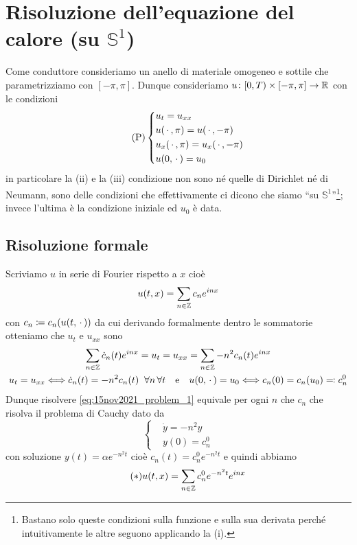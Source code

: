 

\section{Risoluzione dell'equazione del calore (su $\mathbb S^1$)}

Come conduttore consideriamo un anello di materiale omogeneo e sottile che parametrizziamo con $[-\pi, \pi]$. Dunque consideriamo $u \colon [0, T) \times [-\pi, \pi] \to \mathbb R$ con le condizioni
\begin{equation}
\tag{P} \label{eq:15nov2021_problem_1}
\left\{
\begin{aligned}
	& u_t = u_{xx} \\
	& u(\,\cdot\,, \pi) = u(\,\cdot\,, -\pi) \\
	& u_x(\,\cdot\,, \pi) = u_x(\,\cdot\,, -\pi) \\
	& u(0, \,\cdot\,) = u_0
\end{aligned}
\right.
\end{equation}
in particolare la (ii) e la (iii) condizione non sono né quelle di Dirichlet né di Neumann, sono delle condizioni che effettivamente ci dicono che siamo ``su $\mathbb S^1$''\footnote{Bastano solo queste condizioni sulla funzione e sulla sua derivata perché intuitivamente le altre seguono applicando la (i).}; invece l'ultima è la condizione iniziale ed $u_0$ è data.

\subsection{Risoluzione formale}

Scriviamo $u$ in serie di Fourier rispetto a $x$ cioè
$$
u(t, x) = \sum_{n \in \mathbb Z} c_n e^{inx}
$$
con $c_n \coloneqq c_n(u(t, \,\cdot\,))$ da cui derivando formalmente dentro le sommatorie otteniamo che $u_t$ e $u_{xx}$ sono
$$
\begin{gathered}
	\sum_{n \in \mathbb Z} \dot c_n(t) e^{inx} = u_t = u_{xx} = \sum_{n \in \mathbb Z} -n^2 c_n(t) e^{inx} \\
	u_t = u_{xx} \Longleftrightarrow  \dot c_n(t) = -n^2 c_n(t) \;\; \forall n \, \forall t
	\quad
	\text{e} 
	\quad
	u(0, \,\cdot\,) = u_0 \Longleftrightarrow c_n(0) = c_n(u_0) \eqqcolon c_n^0
\end{gathered}
$$
Dunque risolvere \eqref{eq:15nov2021_problem_1} equivale per ogni $n$ che $c_n$ che risolva il problema di Cauchy dato da
\begin{equation}
	\tag{P$'$} \label{eq:15nov2021_problem_2}
	\left\{
	\begin{aligned}
		& \dot y = -n^2 y \\
		& y(0) = c_n^0
	\end{aligned}
	\right.
\end{equation}
con soluzione $y(t) = \alpha e^{-n^2 t}$ cioè $c_n(t) = c_n^0 e^{-n^2 t}$ e quindi abbiamo
\begin{equation}
	\tag{$*$} \label{eq:15nov2021_solution}
	u(t, x) = \sum_{n \in \mathbb Z} c_n^0 e^{-n^2 t} e^{inx}
\end{equation}


